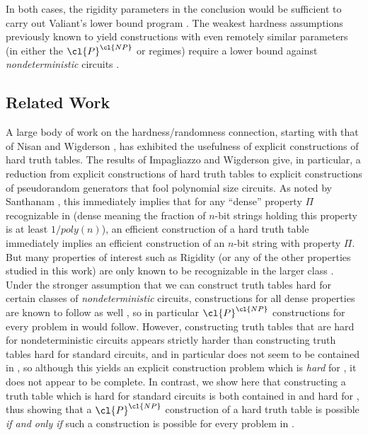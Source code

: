 In both cases, the rigidity parameters in the conclusion would be sufficient to carry out Valiant's lower bound program \cite{Valiant}. The weakest hardness assumptions previously known to yield constructions with even remotely similar parameters (in either the $\cl{P}^\cl{NP}$ or  regimes) require a lower bound against \emph{nondeterministic} circuits \cite{AM-SV}.

\subsection{Related Work}
A large body of work on the hardness/randomness connection, starting with that of Nisan and Wigderson \cite{NW}, has exhibited the usefulness of explicit constructions of hard truth tables. The results of Impagliazzo and Wigderson \cite{IW} give, in particular, a reduction from explicit constructions of hard truth tables to explicit constructions of pseudorandom generators that fool polynomial size circuits. As noted by Santhanam \cite{explicit-constructions}, this immediately implies that for any ``dense'' property $\Pi$ recognizable in  (dense meaning the fraction of $n$-bit strings holding this property is at least $1/poly(n)$), an efficient construction of a hard truth table immediately implies an efficient construction of an $n$-bit string with property $\Pi$. But many properties of interest such as Rigidity (or any of the other properties studied in this work) are only known to be recognizable in the larger class . Under the stronger assumption that we can construct truth tables hard for certain classes of \emph{nondeterministic} circuits, constructions for all dense  properties are known to follow as well \cite{AM-derandomization} \cite{AM-SV}, so in particular $\cl{P}^\cl{NP}$ constructions for every problem in  would follow. However, constructing truth tables that are hard for nondeterministic circuits appears strictly harder than constructing truth tables hard for standard circuits, and in particular does not seem to be contained in , so although this yields an explicit construction problem which is \emph{hard} for , it does not appear to be complete. In contrast, we show here that constructing a truth table which is hard for standard circuits is both contained in and hard for , thus showing that a $\cl{P}^\cl{NP}$ construction of a hard truth table is possible \emph{if and only if} such a construction is possible for every problem in .

